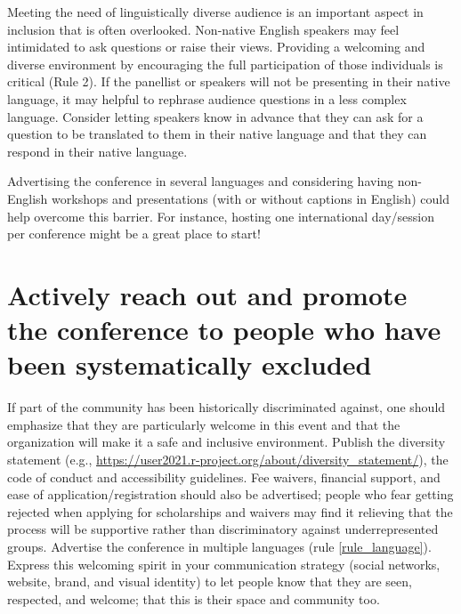 \documentclass[10pt,letterpaper]{article}
\begin{document}
Meeting the need of linguistically diverse audience is an important aspect in inclusion that is often overlooked. Non-native English speakers may feel intimidated to ask questions or raise their views. Providing a welcoming and diverse environment by encouraging the full participation of those individuals is critical (Rule 2). If the panellist or speakers will not be presenting in their native language, it may helpful to rephrase audience questions in a less complex language. Consider letting speakers know in advance that they can ask for a question to be translated to them in their native language and that they can respond in their native language.

Advertising the conference in several languages and considering having non-English workshops and presentations (with or without captions in English) could help overcome this barrier. For instance, hosting one international day/session per conference might be a great place to start!

\section{Actively reach out and promote the conference to people who have been systematically excluded}
\label{rule_communication}
If part of the community has been historically discriminated against, one should emphasize that they are particularly welcome in this event and that the organization will make it a safe and inclusive environment. Publish the diversity statement (e.g., \url{https://user2021.r-project.org/about/diversity_statement/}), the code of conduct and accessibility guidelines. Fee waivers, financial support, and ease of application/registration should also be advertised; people who fear getting rejected when applying for scholarships and waivers may find it relieving that the process will be supportive rather than discriminatory against underrepresented groups. Advertise the conference in multiple languages (rule \ref{rule_language}). Express this welcoming spirit in your communication strategy (social networks, website, brand, and visual identity) to let people know that they are seen, respected, and welcome; that this is their space and community too. 
\end{document}
